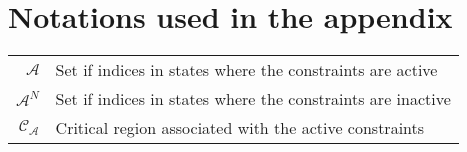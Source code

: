 \section{Notations used in the appendix}
		
  \begin{scriptsize}
\begin{tabularx}{\textwidth}{r|X}
$\mathcal{A}$               & Set if indices in states where the constraints are active\\
$\mathcal{A}^N$               & Set if indices in states where the constraints are inactive\\
$\mathcal{C}_{\mathcal{A}}$               & Critical region associated with the active constraints\\

\end{tabularx}
\end{scriptsize}
